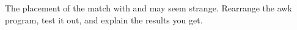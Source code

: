   The placement of the match with  and  may seem
  strange. Rearrange the awk program, test it out, and explain the
  results you get.
